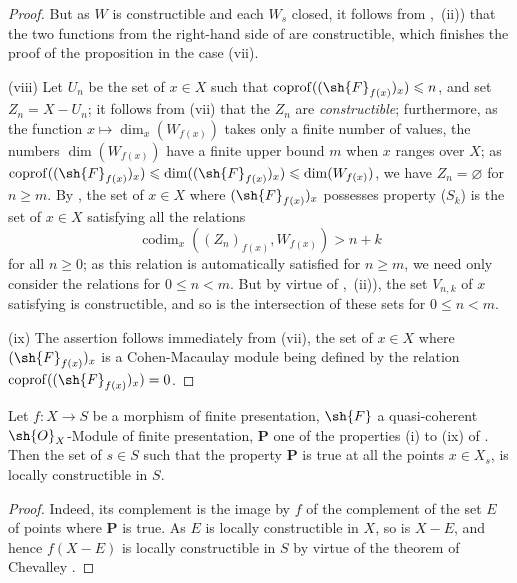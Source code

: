 \begin{proof}
But as $W$ is constructible  and each $W_s$ closed, it follows from ,~(ii)) that the two functions from the right-hand side of  are constructible, which finishes the proof of the proposition in the case (vii).

(viii) Let $U_n$ be the set of $x\in X$ such that $\operatorname{coprof}((\sh{F}_{f(x)})_x)\leqslant n$, and set $Z_n=X-U_n$; it follows from (vii) that the $Z_n$ are \emph{constructible}; furthermore, as the function $x\mapsto\dim_x(W_{f(x)})$ takes only a finite number of values, the numbers $\dim(W_{f(x)})$ have a finite upper bound $m$ when $x$ ranges over $X$; as $\operatorname{coprof}((\sh{F}_{f(x)})_x)\leqslant\dim((\sh{F}_{f(x)})_x)\leqslant\dim(W_{f(x)})$, we have $Z_n=\varnothing$ for $n\geqslant m$.
By , the set of $x\in X$ where $(\sh{F}_{f(x)})_x$ possesses property ($S_k$) is the set of $x\in X$ satisfying all the relations
\begin{equation}
\tag{9.9.2.2}
\label{IV.9.9.2.2}
  \operatorname{codim}_x((Z_n)_{f(x)},W_{f(x)})>n+k
\end{equation}
for all $n\geqslant 0$; as this relation is automatically satisfied for $n\geqslant m$, we need only consider the relations  for $0\leqslant n<m$.
But by virtue of ,~(ii)), the set $V_{n,k}$ of $x$ satisfying  is constructible, and so is the intersection of these sets for $0\leqslant n<m$.

(ix) The assertion follows immediately from (vii), the set of $x\in X$ where $(\sh{F}_{f(x)})_x$ is a Cohen-Macaulay module being defined by the relation $\operatorname{coprof}((\sh{F}_{f(x)})_x)=0$.
\end{proof}

\begin{corollary}[9.9.3]
\label{IV.9.9.3}
Let $f:X\to S$ be a morphism of finite presentation, $\sh{F}$ a quasi-coherent $\sh{O}_X$-Module of finite presentation, $\mathbf{P}$ one of the properties (i) to (ix) of .
Then the set of $s\in S$ such that the property $\mathbf{P}$ is true at all the points $x\in X_s$, is locally constructible in $S$.
\end{corollary}

\begin{proof}
\label{IV.9.9.3-proof}
Indeed, its complement is the image by $f$ of the complement of the set $E$ of points where $\mathbf{P}$ is true.
As $E$ is locally constructible in $X$, so is $X-E$, and hence $f(X-E)$ is locally constructible in $S$ by virtue of the theorem of Chevalley .
\end{proof}

